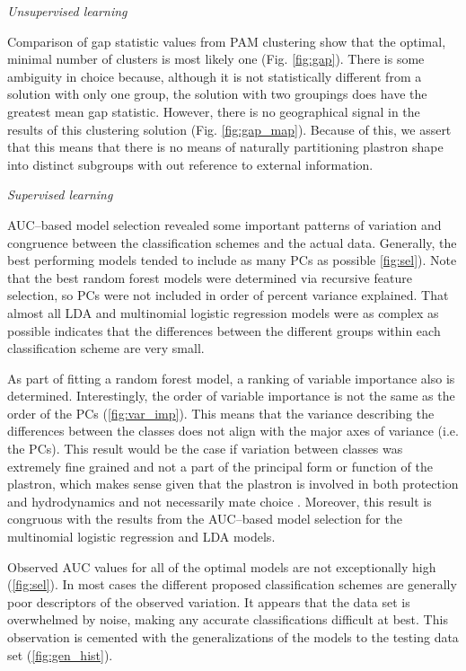 \documentclass[12pt,letterpaper]{article}
\renewcommand{\subsection}[1]{%
\bigskip
\begin{center}
\begin{large}
\normalfont\itshape #1
\end{large}
\end{center}}
\begin{document}
\subsection{Unsupervised learning}
Comparison of gap statistic values from PAM clustering show that the optimal, minimal number of clusters is most likely one (Fig. \ref{fig:gap}). There is some ambiguity in choice because, although it is not statistically different from a solution with only one group, the solution with two groupings does have the greatest mean gap statistic. However, there is no geographical signal in the results of this clustering solution (Fig. \ref{fig:gap_map}). Because of this, we assert that this means that there is no means of naturally partitioning plastron shape into distinct subgroups with out reference to external information.

\subsection{Supervised learning}
AUC--based model selection revealed some important patterns of variation and congruence between the classification schemes and the actual data. Generally, the best performing models tended to include as many PCs as possible \ref{fig:sel}). Note that the best random forest models were determined via recursive feature selection, so PCs were not included in order of percent variance explained. That almost all LDA and multinomial logistic regression models were as complex as possible indicates that the differences between the different groups within each classification scheme are very small.

As part of fitting a random forest model, a ranking of variable importance also is determined. Interestingly, the order of variable importance is not the same as the order of the PCs (\ref{fig:var_imp}). This means that the variance describing the differences between the classes does not align with the major axes of variance (i.e. the PCs). This result would be the case if variation between classes was extremely fine grained and not a part of the principal form or function of the plastron, which makes sense given that the plastron is involved in both protection and hydrodynamics and not necessarily mate choice \citep{Germano2009,Holland1992,Lubcke2007,Rivera2008}. Moreover, this result is congruous with the results from the AUC--based model selection for the multinomial logistic regression and LDA models.

Observed AUC values for all of the optimal models are not exceptionally high (\ref{fig:sel}). In most cases the different proposed classification schemes are generally poor descriptors of the observed variation. It appears that the data set is overwhelmed by noise, making any accurate classifications difficult at best. This observation is cemented with the generalizations of the models to the testing data set (\ref{fig:gen_hist}).
\end{document}
